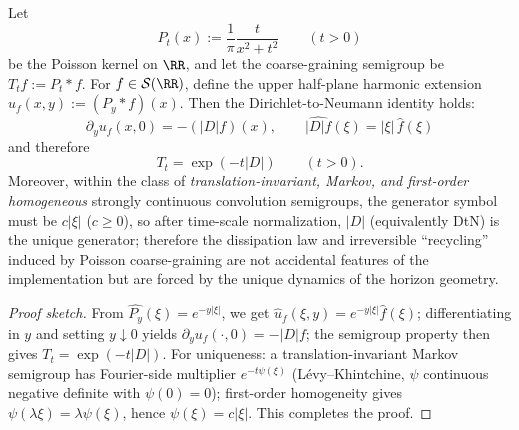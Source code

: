 \begin{proposition}\label{con:discussion-dtn-generator}
Let
\[
P_t(x):=\frac{1}{\pi}\frac{t}{x^2+t^2}\qquad(t>0)
\]
be the Poisson kernel on \(\RR\), and let the coarse-graining semigroup be \(T_t f:=P_t*f\).
For \(f\in\mathcal{S}(\RR)\), define the upper half-plane harmonic extension
\(
u_f(x,y):=(P_y*f)(x)
\).
Then the Dirichlet-to-Neumann identity holds:
\[
\boxed{\;
\partial_y u_f(x,0)=-(|D|f)(x),\qquad \widehat{|D|f}(\xi)=|\xi|\,\widehat f(\xi)\;}
\]
and therefore
\[
\boxed{\;T_t=\exp(-t|D|)\qquad(t>0).\;}
\]
Moreover, within the class of \emph{translation-invariant, Markov, and first-order homogeneous} strongly continuous convolution semigroups, the generator symbol must be \(c|\xi|\) (\(c\ge 0\)), so after time-scale normalization, \( |D| \) (equivalently DtN) is the unique generator; therefore the dissipation law and irreversible ``recycling'' induced by Poisson coarse-graining are not accidental features of the implementation but are forced by the unique dynamics of the horizon geometry.
\end{proposition}
\begin{proof}[Proof sketch]
From \(\widehat{P_y}(\xi)=e^{-y|\xi|}\), we get \(\widehat u_f(\xi,y)=e^{-y|\xi|}\widehat f(\xi)\); differentiating in \(y\) and setting \(y\downarrow 0\) yields \(\partial_y u_f(\cdot,0)=-|D|f\);
the semigroup property then gives \(T_t=\exp(-t|D|)\).
For uniqueness: a translation-invariant Markov semigroup has Fourier-side multiplier \(e^{-t\psi(\xi)}\) (L\'evy--Khintchine, \(\psi\) continuous negative definite with \(\psi(0)=0\)); first-order homogeneity gives \(\psi(\lambda\xi)=\lambda\psi(\xi)\), hence \(\psi(\xi)=c|\xi|\). This completes the proof.
\end{proof}

